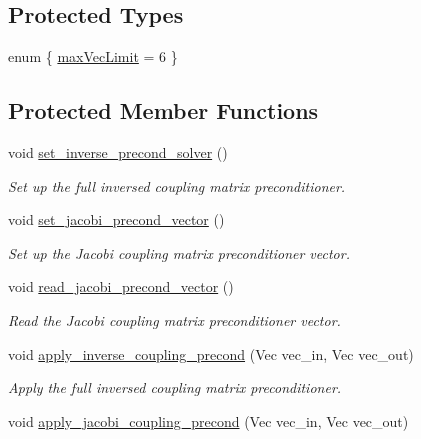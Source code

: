 \subsection*{Protected Types}
\begin{DoxyCompactItemize}
\item 
enum \{ \hyperlink{classcarl_1_1_f_e_t_i___operations_a6c98b3cd5887cc030609a3aaf7b1f202ac039a3f911176eb2dca0ef95a7349edb}{max\+Vec\+Limit} = 6
 \}
\end{DoxyCompactItemize}
\subsection*{Protected Member Functions}
\begin{DoxyCompactItemize}
\item 
void \hyperlink{classcarl_1_1_f_e_t_i___operations_ad8f552c64ab905c4c8850f4678fec4e2}{set\+\_\+inverse\+\_\+precond\+\_\+solver} ()
\begin{DoxyCompactList}\small\item\em Set up the full inversed coupling matrix preconditioner. \end{DoxyCompactList}\item 
void \hyperlink{classcarl_1_1_f_e_t_i___operations_a6f88d5f12a587e1608797f7d15ef5f64}{set\+\_\+jacobi\+\_\+precond\+\_\+vector} ()
\begin{DoxyCompactList}\small\item\em Set up the Jacobi coupling matrix preconditioner vector. \end{DoxyCompactList}\item 
void \hyperlink{classcarl_1_1_f_e_t_i___operations_ac5592b98960866a9fbc214919030bf01}{read\+\_\+jacobi\+\_\+precond\+\_\+vector} ()
\begin{DoxyCompactList}\small\item\em Read the Jacobi coupling matrix preconditioner vector. \end{DoxyCompactList}\item 
void \hyperlink{classcarl_1_1_f_e_t_i___operations_a37d7c82069c7095d7b8d539cffbf8e02}{apply\+\_\+inverse\+\_\+coupling\+\_\+precond} (Vec vec\+\_\+in, Vec vec\+\_\+out)
\begin{DoxyCompactList}\small\item\em Apply the full inversed coupling matrix preconditioner. \end{DoxyCompactList}\item 
void \hyperlink{classcarl_1_1_f_e_t_i___operations_acce4b6c9b00e73aa08a4f6d830aa5eba}{apply\+\_\+jacobi\+\_\+coupling\+\_\+precond} (Vec vec\+\_\+in, Vec vec\+\_\+out)

\end{DoxyCompactItemize}
